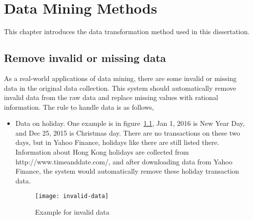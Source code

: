 \chapter{Data Mining Methods}
\label{ch:mining}

This chapter introduces the data transformation method used in this dissertation.
\section{Remove invalid or missing data}
As a real-world applications of data mining, there are some invalid or missing data in the original data collection. This system should automatically remove invalid data from the raw data and replace missing values with rational information. The rule to handle data is as follows,

\clearpage
\begin{itemize}
	\item Data on holiday. One example is in figure~\ref{fg:invalid_data}, Jan 1, 2016 is New Year Day, and Dec 25, 2015 is Christmas day. There are no transactions on these two days, but in Yahoo Finance, holidays like there are still listed there. Information about Hong Kong holidays are collected from http://www.timeanddate.com/, and after downloading data from Yahoo Finance, the system would automatically remove these holiday transaction data.
	\begin{figure}[h]
		\centering
		\texttt{[image: invalid-data]}
		\caption{Example for invalid data}
		\label{fg:invalid_data}
	\end{figure}
\end{itemize}
